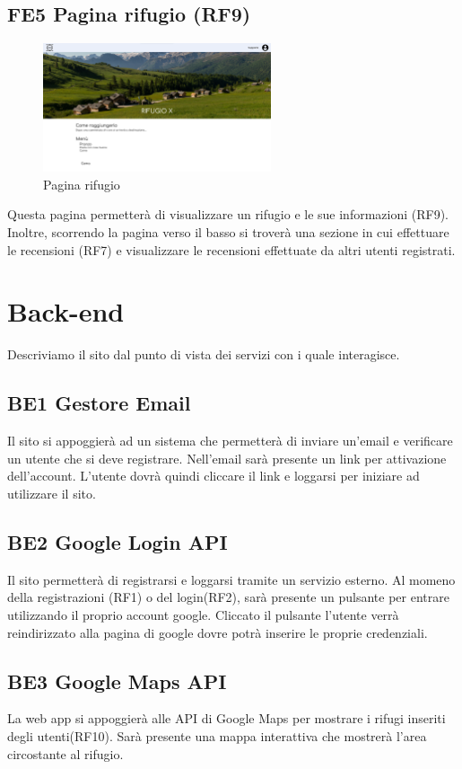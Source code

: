 \documentclass[a4paper,12pt]{article}
\begin{document}
\subsection*{FE5 Pagina rifugio (RF9)}
\begin{figure}[H]
   \centering
    \includegraphics[width=0.6\textwidth]{img/Pagina rifugio.png}
    \caption{Pagina rifugio}
\end{figure}
Questa pagina permetterà di visualizzare un rifugio e le sue informazioni (RF9). Inoltre, scorrendo la pagina verso il basso si troverà una sezione in cui effettuare le recensioni (RF7) e visualizzare le recensioni effettuate da altri utenti registrati.


\newpage
\section{Back-end}

Descriviamo il sito dal punto di vista dei servizi con i quale interagisce.

\subsection*{BE1 Gestore Email}
Il sito si appoggierà ad un sistema che permetterà di inviare un'email e verificare un utente che si deve registrare. Nell'email sarà presente un link per attivazione dell'account. L'utente dovrà quindi cliccare il link e loggarsi per iniziare ad utilizzare il sito.


\subsection*{BE2 Google Login API}
Il sito permetterà di registrarsi e loggarsi tramite un servizio esterno. Al momeno della registrazioni (RF1) o del login(RF2), sarà presente un pulsante per entrare utilizzando il proprio account google. Cliccato il pulsante l'utente verrà reindirizzato alla pagina di google dovre potrà inserire le proprie credenziali.

\subsection*{BE3 Google Maps API}
La web app si appoggierà alle API di Google Maps per mostrare i rifugi inseriti degli utenti(RF10). Sarà presente una mappa interattiva che mostrerà l'area circostante al rifugio.
\end{document}
